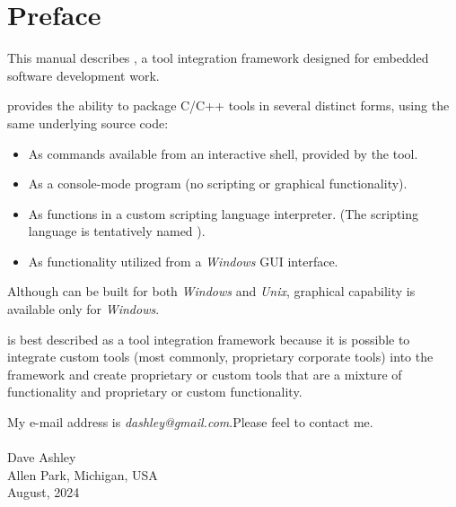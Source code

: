 \chapter{Preface}

This manual describes \emph{\productname{}}, a tool integration
framework designed for embedded software development work.

\emph{\productname{}} provides the ability to package C/C++ tools
in several distinct forms, using the same underlying source code:

\begin{itemize}
      \item As commands available from an interactive shell, provided
            by the tool.
      \item As a console-mode program (no scripting or graphical functionality).
      \item As functions in a custom scripting language interpreter.
            (The scripting language is tentatively
            named \emph{\scriptinglanguagenamemc{}}).
      \item As functionality utilized from a \emph{Windows} GUI interface.
\end{itemize}

Although \emph{\productname{}} can be built for both \emph{Windows} and
\emph{Unix}, graphical capability is available only for \emph{Windows}.

\emph{\productname{}} is best described as a tool integration framework
because it is possible to integrate custom tools (most commonly,
proprietary corporate tools) into the framework and create proprietary or
custom tools that are a mixture of \emph{\productname{}} functionality
and proprietary or custom functionality.

My e-mail address is \emph{dashley@gmail.com}.\@ Please feel
to contact me.
\\\\
\noindent\hspace*{2.5in}Dave Ashley\\
\noindent\hspace*{2.5in}Allen Park, Michigan, USA\\
\noindent\hspace*{2.5in}August, 2024
